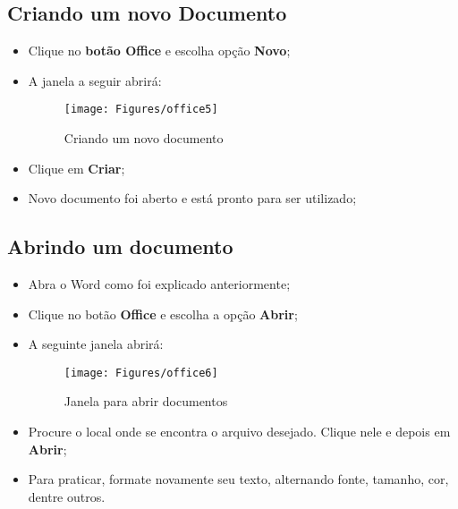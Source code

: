 \documentclass[hidelinks,12pt]{article}
\begin{document}
	\subsection{Criando um novo Documento}

	\begin{itemize}

		\item Clique no \textbf{botão Office} e escolha opção \textbf {Novo};

		\item A janela a seguir abrirá:


		\begin{figure}[!h]
			\centering
			\texttt{[image: Figures/office5]}
			\label{fig:office5}
			\caption{Criando um novo documento}
		\end{figure}

		\item Clique em \textbf{Criar};

		\item Novo documento foi aberto e está pronto para ser utilizado;


	\end{itemize}
	\newpage
	\subsection{Abrindo um documento}

		\begin{itemize}

		\item Abra o Word como foi explicado anteriormente;

		\item Clique no botão \textbf{Office} e escolha a opção \textbf{Abrir};

		\item A seguinte janela abrirá:

		\begin{figure}[!h]
			\centering
			\texttt{[image: Figures/office6]}
			\label{fig:office6}
			\caption{Janela para abrir documentos}
		\end{figure}

		\item Procure o local onde se encontra o arquivo desejado. Clique nele e depois em \textbf{Abrir};

		\item Para praticar, formate novamente seu texto, alternando fonte, tamanho, cor, dentre outros.

		\end{itemize}
\end{document}
